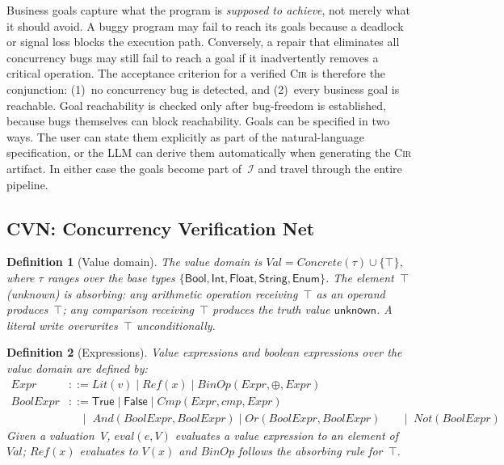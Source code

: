 \documentclass[sigconf]{acmart}
\newtheorem{definition}{Definition}
\begin{document}
Business goals capture what the program is \emph{supposed to achieve}, not merely what it should avoid. A buggy program may fail to reach its goals because a deadlock or signal loss blocks the execution path. Conversely, a repair that eliminates all concurrency bugs may still fail to reach a goal if it inadvertently removes a critical operation. The acceptance criterion for a verified \textsc{Cir} is therefore the conjunction: (1)~no concurrency bug is detected, and (2)~every business goal is reachable. Goal reachability is checked only after bug-freedom is established, because bugs themselves can block reachability. Goals can be specified in two ways. The user can state them explicitly as part of the natural-language specification, or the LLM can derive them automatically when generating the \textsc{Cir} artifact. In either case the goals become part of~$\mathcal{I}$ and travel through the entire pipeline.


\subsection{CVN: Concurrency Verification Net}
\label{subsec:cvn-def}

\begin{definition}[Value domain]
\label{def:val}
The value domain is $\mathit{Val}=\mathit{Concrete}(\tau)\cup\{\top\}$, where $\tau$ ranges over the base types $\{\textsf{Bool},\textsf{Int},\textsf{Float},\textsf{String},\textsf{Enum}\}$. The element~$\top$ (\emph{unknown}) is absorbing: any arithmetic operation receiving~$\top$ as an operand produces~$\top$; any comparison receiving~$\top$ produces the truth value $\mathsf{unknown}$. A literal write overwrites~$\top$ unconditionally.
\end{definition}

\begin{definition}[Expressions]
\label{def:expressions}
\emph{Value expressions} and \emph{boolean expressions} over the value domain are defined by:
\begin{align*}
  \mathit{Expr} &::=
    \mathit{Lit}(v) \mid
    \mathit{Ref}(x) \mid
    \mathit{BinOp}(\mathit{Expr},\oplus,\mathit{Expr}) \\[4pt]
  \mathit{BoolExpr} &::=
    \textsf{True} \mid \textsf{False} \mid
    \mathit{Cmp}(\mathit{Expr},\mathit{cmp},\mathit{Expr}) \\
    &\quad\mid\;
    \mathit{And}(\mathit{BoolExpr},\mathit{BoolExpr}) \mid
    \mathit{Or}(\mathit{BoolExpr},\mathit{BoolExpr}) 
    &\quad\mid\;
    \mathit{Not}(\mathit{BoolExpr})
\end{align*}
Given a valuation~$V$, $\mathit{eval}(e,V)$ evaluates a value expression to an element of $\mathit{Val}$; $\mathit{Ref}(x)$ evaluates to $V(x)$ and $\mathit{BinOp}$ follows the absorbing rule for~$\top$.
\end{definition}
\end{document}
